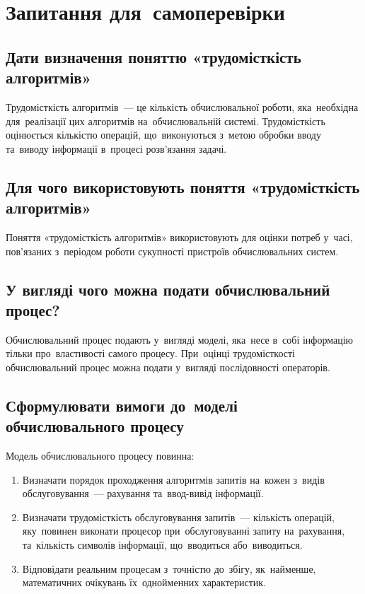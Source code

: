 \documentclass[
	a4paper,
	oneside,
	BCOR = 10mm,
	DIV = 12,
	12pt,
	headings = normal,
]{scrartcl}
\begin{document}
	\section{Запитання для~самоперевірки}

		\subsection{Дати визначення поняттю «трудомісткість алгоритмів»}
			Трудомісткість алгоритмів~— це кількість обчислювальної роботи, яка~необхідна для~реалізації цих алгоритмів на~обчислювальній системі. Трудомісткість оцінюється кількістю операцій, що~виконуються з~метою обробки вводу та~виводу інформації в~процесі роз\-в'я\-за\-ння задачі.

		\subsection{Для чого використовують поняття «трудомісткість алгоритмів»}
			Поняття «трудомісткість алгоритмів» використовують для оцінки потреб у~часі, пов'\-я\-за\-них з~періодом роботи сукупності пристроїв обчислювальних систем.

		\subsection{У вигляді чого можна подати обчислювальний процес?}
			Обчислювальний процес подають у~вигляді моделі, яка~несе в~собі інформацію тільки про~властивості самого процесу. При~оцінці трудомісткості обчислювальний процес можна подати у~вигляді послідовності операторів. 

		\subsection{Сформулювати вимоги до~моделі обчислювального процесу}
			Модель обчислювального процесу повинна:
			\begin{enumerate}[itemsep = 1\baselineskip]
				\item Визначати порядок проходження алгоритмів запитів на~кожен з~видів обслуговування~— рахування та~ввод-вивід інформації.
				\item Визначати трудомісткість обслуговування запитів~— кількість операцій, яку~повинен виконати процесор при~обслуговуванні запиту на~рахування, та~кількість символів інформації, що~вводиться або~виводиться. 
				\item Відповідати реальним процесам з~точністю до~збігу, як~найменше, математичних очікувань їх~однойменних характеристик. 
			\end{enumerate}
\end{document}
